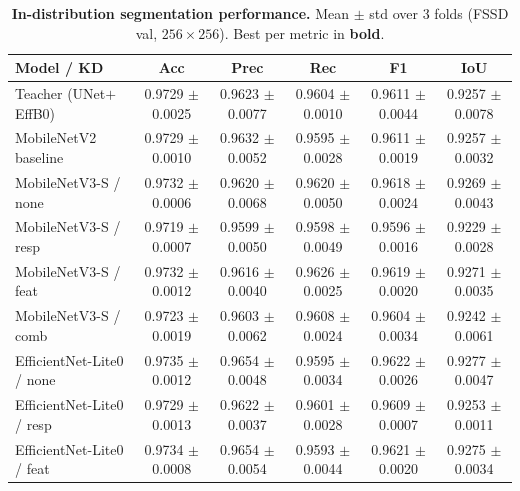 \begin{table}[ht]
\centering
\caption{\textbf{In-distribution segmentation performance.} Mean $\pm$ std over 3 folds (FSSD val, $256{\times}256$). Best per metric in \textbf{bold}.}
\label{tab:t2-segmentation}
\small
\setlength{\tabcolsep}{4pt}
\begin{tabular}{lccccc}
\toprule
\textbf{Model / KD}                & \textbf{Acc}             & \textbf{Prec}            & \textbf{Rec}             & \textbf{F1}              & \textbf{IoU}             \\
\midrule
Teacher (UNet$+$EffB0)             & 0.9729 $\pm$ 0.0025      & 0.9623 $\pm$ 0.0077      & 0.9604 $\pm$ 0.0010      & 0.9611 $\pm$ 0.0044      & 0.9257 $\pm$ 0.0078      \\
MobileNetV2 baseline               & 0.9729 $\pm$ 0.0010      & 0.9632 $\pm$ 0.0052      & 0.9595 $\pm$ 0.0028      & 0.9611 $\pm$ 0.0019      & 0.9257 $\pm$ 0.0032      \\
\midrule
MobileNetV3-S / none               & 0.9732 $\pm$ 0.0006      & 0.9620 $\pm$ 0.0068      & 0.9620 $\pm$ 0.0050      & 0.9618 $\pm$ 0.0024      & 0.9269 $\pm$ 0.0043      \\
MobileNetV3-S / resp               & 0.9719 $\pm$ 0.0007      & 0.9599 $\pm$ 0.0050      & 0.9598 $\pm$ 0.0049      & 0.9596 $\pm$ 0.0016      & 0.9229 $\pm$ 0.0028      \\
MobileNetV3-S / feat               & 0.9732 $\pm$ 0.0012      & 0.9616 $\pm$ 0.0040      & 0.9626 $\pm$ 0.0025      & 0.9619 $\pm$ 0.0020      & 0.9271 $\pm$ 0.0035      \\
MobileNetV3-S / comb               & 0.9723 $\pm$ 0.0019      & 0.9603 $\pm$ 0.0062      & 0.9608 $\pm$ 0.0024      & 0.9604 $\pm$ 0.0034      & 0.9242 $\pm$ 0.0061      \\
\midrule
EfficientNet-Lite0 / none          & 0.9735 $\pm$ 0.0012      & 0.9654 $\pm$ 0.0048      & 0.9595 $\pm$ 0.0034      & 0.9622 $\pm$ 0.0026      & 0.9277 $\pm$ 0.0047      \\
EfficientNet-Lite0 / resp          & 0.9729 $\pm$ 0.0013      & 0.9622 $\pm$ 0.0037      & 0.9601 $\pm$ 0.0028      & 0.9609 $\pm$ 0.0007      & 0.9253 $\pm$ 0.0011      \\
EfficientNet-Lite0 / feat          & 0.9734 $\pm$ 0.0008      & 0.9654 $\pm$ 0.0054      & 0.9593 $\pm$ 0.0044      & 0.9621 $\pm$ 0.0020      & 0.9275 $\pm$ 0.0034      \\

\end{tabular}
\end{table}
